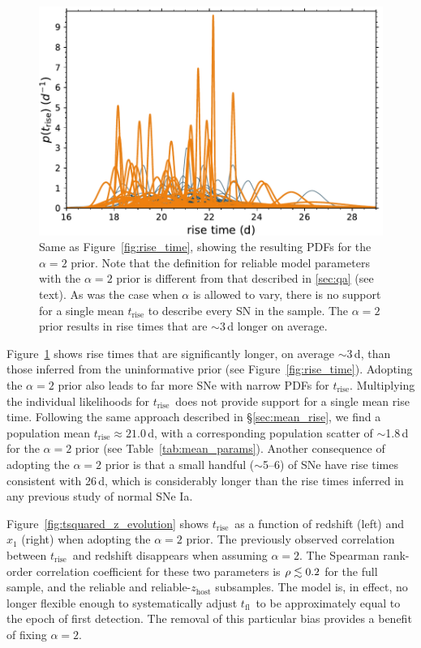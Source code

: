 \documentclass[twocolumn]{aastex63}
\newcommand{\tfl}{$t_\mathrm{fl}$}
\newcommand{\trise}{$t_\mathrm{rise}$}
\begin{document}
\begin{figure}
    \centering
    \includegraphics[width=1\linewidth]{./figures/tsquared_rise_time.pdf}
    \caption{Same as Figure~\ref{fig:rise_time}, showing the resulting PDFs
    for the $\alpha = 2$ prior. Note that the definition for reliable model
    parameters with the $\alpha = 2$ prior is different from that described in
    \ref{sec:qa} (see text). As was the case when $\alpha$ is allowed to vary,
    there is no support for a single mean $t_\mathrm{rise}$ to describe every
    SN in the sample. The $\alpha = 2$ prior results in rise times that are
    $\sim$3\,d longer on average.}
    \label{fig:tsquared_rise}
\end{figure}

Figure~\ref{fig:tsquared_rise} shows rise times that are significantly longer,
on average $\sim$3\,d, than those inferred from the uninformative prior (see
Figure~\ref{fig:rise_time}). Adopting the $\alpha = 2$ prior also leads to far
more SNe with narrow PDFs for \trise. Multiplying the individual likelihoods
for \trise\ does not provide support for a single mean rise time. Following
the same approach described in \S\ref{sec:mean_rise}, we find a population
mean \trise\;$\approx 21.0$\,d, with a corresponding population scatter of
$\sim$1.8\,d for the $\alpha = 2$ prior (see Table~\ref{tab:mean_params}).
Another consequence of adopting the $\alpha = 2$ prior is that a small handful
($\sim$5--6) of SNe have rise times consistent with 26\,d, which is
considerably longer than the rise times inferred in any previous study of
normal SNe Ia.

Figure~\ref{fig:tsquared_z_evolution} shows \trise\ as a function of redshift
(left) and $x_1$ (right) when adopting the $\alpha = 2$ prior. The previously
observed correlation between \trise\ and redshift disappears when assuming
$\alpha = 2$. The Spearman rank-order correlation coefficient for these two
parameters is $\rho \lesssim 0.2$ for the full sample, and the reliable and
reliable-$z_\mathrm{host}$ subsamples. The model is, in effect, no longer
flexible enough to systematically adjust \tfl\ to be approximately equal to
the epoch of first detection. The removal of this particular bias provides a
benefit of fixing $\alpha = 2$.
\end{document}
